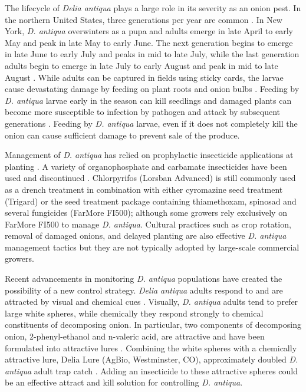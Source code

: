\documentclass[alpha-refs]{wiley-article}
\begin{document}
The lifecycle of \textit{Delia antiqua} plays a large role in its severity as an onion pest.  In the northern United States, three generations per year are common \citep{eckenrode1975population, hoepting2004insecticide}. In New York, \textit{D. antiqua} overwinters as a pupa and adults emerge in late April to early May and peak in late May to early June. The next generation begins to emerge in late June to early July and peaks in mid to late July, while the last generation adults begin to emerge in late July to early August and peak in mid to late August \citep{nault2011delaying}. While adults can be captured in fields using sticky cards, the larvae cause devastating damage by feeding on plant roots and onion bulbs \citep{nault2006onion, nault2006performance}. Feeding by \textit{D. antiqua} larvae early in the season can kill seedlings and damaged plants can become more susceptible to infection by pathogen and attack by subsequent generations \citep{eckenrode1986impact,nault2006performance}.  Feeding by \textit{D. antiqua} larvae, even if it does not completely kill the onion can cause sufficient damage to prevent sale of the produce.   

Management of \textit{D. antiqua} has relied on prophylactic insecticide applications at planting \citep{nault2006performance}. A variety of organophosphate and carbamate insecticides have been used and discontinued \citep{nault2006performance}. Chlorpyrifos (Lorsban Advanced) is still commonly used as a drench treatment in combination with either cyromazine seed treatment (Trigard) \citep{nault2006performance,nault2006onion} or the seed treatment package containing thiamethoxam, spinosad and several fungicides (FarMore FI500); although some growers rely exclusively on FarMore FI500 to manage \textit{D. antiqua}. Cultural practices such as crop rotation, removal of damaged onions, and delayed planting are also effective \textit{D. antiqua} management tactics \citep{martinson1988dispersal,finch1985influence,nault2011delaying} but they are not typically adopted by large-scale commercial growers.   

Recent advancements in monitoring \textit{D. antiqua} populations have created the possibility of a new control strategy. \textit{Delia antiqua} adults respond to and are attracted by visual and chemical cues \citep{harris1988host,harris1983color,thomingdeveloping,otto2000development}. Visually, \textit{D. antiqua} adults tend to prefer large white spheres, while chemically they respond strongly to chemical constituents of decomposing onion. In particular, two components of decomposing onion, 2-phenyl-ethanol and n-valeric acid, are attractive and have been formulated into attractive lures \citep{ishikawa1984mixture,ishikawa1987controlled,kuhar2006field}. Combining the white spheres with a chemically attractive lure, Delia Lure (AgBio, Westminster, CO), approximately doubled \textit{D. antiqua} adult trap catch \citep{willett2019}. Adding an insecticide to these attractive spheres could be an effective attract and kill solution for controlling \textit{D. antiqua}.
\end{document}

